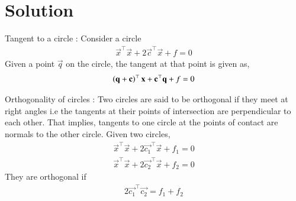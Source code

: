 \documentclass[journal,12pt,twocolumn]{IEEEtran}
\begin{document}
\section{Solution}
\begin{lemma}
Tangent to a circle : Consider a circle 
\begin{align}
    \vec{x}^\top\vec{x} + 2\vec{c}^\top\vec{x} + f = 0 
\end{align}
Given a point $\vec{q}$ on the circle, the tangent at that point is given as,
\begin{align}
    \left(\mathbf{q}+\mathbf{c}\right)^\top\mathbf{x} + \mathbf{c}^\top\mathbf{q} + f = 0 
\end{align}
\end{lemma}
\begin{lemma}
Orthogonality of circles : Two circles are said to be orthogonal if they meet at right angles i.e the tangents at their points of intersection are perpendicular to each other. That implies, tangents to one circle at the points of contact are normals to the other circle. 
Given two circles,
\begin{align}
    \vec{x}^\top\vec{x} + 2\vec{c_1}^\top\vec{x} + f_1 = 0 \label{eq1}\\
    \vec{x}^\top\vec{x} + 2\vec{c_2}^\top\vec{x} + f_2 = 0 \label{eq2}
\end{align}
They are orthogonal if
\begin{align}
    2\vec{c_1}^\top\vec{c_2} = f_1 + f_2 \label{condition}
\end{align}
\end{lemma}
\end{document}
